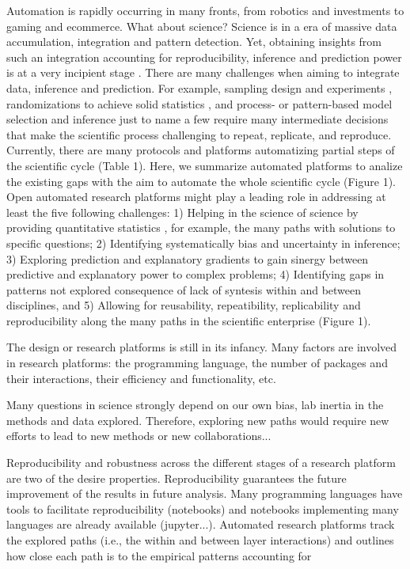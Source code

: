 \documentclass[english,12pt]{article}
\begin{document}
Automation is rapidly occurring in many fronts, from robotics and
investments to gaming and ecommerce. What about science? Science is in
a era of massive data accumulation, integration and pattern
detection. Yet, obtaining insights from such an integration accounting
for reproducibility, inference and prediction power is at a very
incipient stage \citep{Ioannidis2005,Reichsteietal2019}. There are
many challenges when aiming to integrate data, inference and
prediction. For example, sampling design and experiments  \citep{Voelkl2018}, randomizations to achieve solid
statistics , and process- or pattern-based
model selection and inference  just to name a
few require many intermediate decisions that make the scientific
process challenging to repeat, replicate, and reproduce. Currently,
there are many protocols and platforms automatizing partial steps of
the scientific cycle (Table 1). Here, we summarize automated platforms
to analize the existing gaps with the aim to automate the whole
scientific cycle (Figure 1). Open automated research platforms
 might play a leading role in
addressing at least the five following challenges: 1) Helping in the
science of science by providing quantitative statistics
\citep{Fortunatoeaao0185}, for example, the many paths with solutions
to specific questions; 2) Identifying systematically bias and
uncertainty in inference; 3) Exploring prediction and explanatory
gradients to gain sinergy between predictive and explanatory power to
complex problems; 4) Identifying gaps in patterns not explored
consequence of lack of syntesis within and between disciplines, and 5)
Allowing for reusability, repeatibility, replicability and
reproducibility along the many paths in the scientific enterprise
(Figure 1).

The design or research platforms is still in its infancy. Many factors
are involved in research platforms: the programming language, the
number of packages and their interactions, their efficiency and
functionality, etc.


Many questions in science strongly depend on our own bias, lab inertia
in the methods and data explored. Therefore, exploring new paths would
require new efforts to lead to new methods or new collaborations...

Reproducibility and robustness across the different stages of a
research platform are two of the desire properties. Reproducibility
guarantees the future improvement of the results in future
analysis. Many programming languages have tools to facilitate
reproducibility (notebooks) and notebooks implementing many languages
are already available (jupyter...). Automated research platforms track
the explored paths (i.e., the within and between layer interactions)
and outlines how close each path is to the empirical patterns
accounting for
\end{document}
